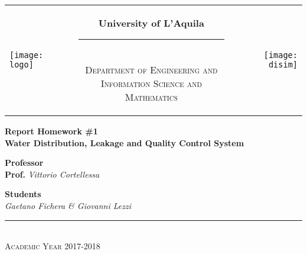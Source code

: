 \begin{titlepage}
\begin{center}
\normalsize

\begin{center}

\begin{tabular}[t]{@{} l @{} c @{} r @{}}
\parbox[c]{0.15\textwidth}{\raggedright \texttt{[image: logo]}}
&
\parbox[c]{0.7\textwidth}
{
\centering \bfseries
University of L'Aquila \\[-5pt]
\rule{0.6\textwidth}{1pt} \\
{\centering \scshape \small Department of Engineering and \\Information Science and Mathematics} \\}
&
\parbox[c]{0.15\textwidth}{\raggedleft \texttt{[image: disim]}}
\end{tabular}
\end{center}

\bigskip \bigskip



\bigskip
\bigskip
\bigskip

\vfil

{\bfseries \large
Report Homework \#1 \\}
{\bfseries \Large
Water Distribution, Leakage and Quality Control System
}

{\large
\bigskip
\bigskip
\bigskip
\bigskip
{\bfseries \large Professor \\ }
\bigskip
\textbf{Prof.} \textit{Vittorio Cortellessa} \\
}

{\large
\bigskip
\bigskip
\bigskip
\bigskip
{\bfseries \large Students \\ }
\bigskip
\textit{Gaetano Fichera \& Giovanni Lezzi} \\
}

\vfil
\vfil

\vspace{2\baselineskip}


\vfil \vfil \vfil

\rule{\textwidth}{1pt}\\
{\scshape Academic Year 2017-2018}

\end{center}
\end{titlepage}